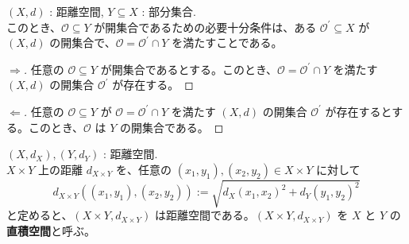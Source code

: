 \documentclass[article,paper=a4paper]{jlreq}
\begin{document}
\begin{thm}
    \quad $(X,d)$ : 距離空間, $Y \subseteq X$ : 部分集合.\\
    このとき、$\mathcal{O} \subseteq Y$ が開集合であるための必要十分条件は、ある $\mathcal{O}^\prime \subseteq X$ が $(X,d)$ の開集合で、$\mathcal{O} = \mathcal{O}^\prime \cap Y$ を満たすことである。
\end{thm}

\begin{proof}[$\Longrightarrow$]
    任意の $\mathcal{O} \subseteq Y$ が開集合であるとする。このとき、$\mathcal{O} = \mathcal{O}^\prime \cap Y$ を満たす $(X,d)$ の開集合 $\mathcal{O}^\prime$ が存在する。
\end{proof}

\begin{proof}[$\Longleftarrow$]
    任意の $\mathcal{O} \subseteq Y$ が $\mathcal{O} = \mathcal{O}^\prime \cap Y$ を満たす $(X,d)$ の開集合 $\mathcal{O}^\prime$ が存在するとする。このとき、$\mathcal{O}$ は $Y$ の開集合である。
\end{proof}

\begin{dfn}
    \quad $(X,d_X), (Y,d_Y)$ : 距離空間.\\
    $X \times Y$ 上の距離 $d_{X \times Y}$ を、任意の $(x_1,y_1), (x_2,y_2) \in X \times Y$ に対して
    \[d_{X \times Y}((x_1,y_1),(x_2,y_2)) := \sqrt{d_X(x_1,x_2)^2 + d_Y(y_1,y_2)^2}\]
    と定めると、$(X \times Y, d_{X \times Y})$ は距離空間である。$(X \times Y, d_{X \times Y})$ を $X$ と $Y$ の\textbf{直積空間}と呼ぶ。
\end{dfn}
\end{document}
